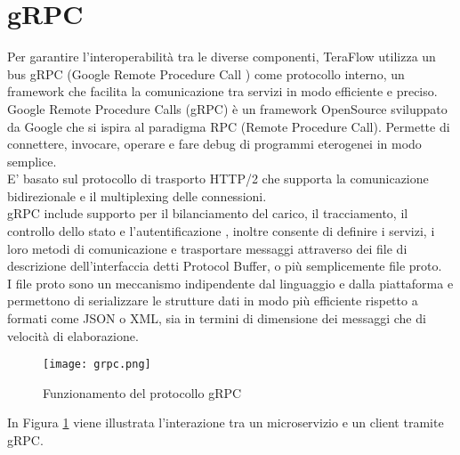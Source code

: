 \section{gRPC} \label{grpc}
Per garantire l'interoperabilità tra le diverse componenti, TeraFlow utilizza un bus gRPC (Google Remote Procedure Call \cite{grpc}) come protocollo interno, 
un framework che facilita la comunicazione tra servizi in modo efficiente e preciso. 
\\Google Remote Procedure Calls (gRPC\cite{grpc}) è un framework OpenSource sviluppato da Google che si ispira al paradigma RPC (Remote Procedure Call). Permette di
connettere, invocare, operare e fare debug di programmi eterogenei in modo semplice.
\\E' basato sul protocollo di trasporto HTTP/2 che supporta la comunicazione bidirezionale e il multiplexing delle connessioni.
\\gRPC include supporto per il bilanciamento del carico, il tracciamento, il controllo dello stato e l'autentificazione\cite{grpcArt3} \cite{grpcArt1}, inoltre
consente di definire i servizi, i loro metodi di comunicazione e trasportare messaggi attraverso dei file di descrizione dell'interfaccia detti Protocol Buffer, o più semplicemente file proto.
\\I file proto sono un meccanismo indipendente dal linguaggio e dalla piattaforma 
e permettono di serializzare le strutture dati in modo più efficiente rispetto a formati come JSON o XML, sia in termini di dimensione dei messaggi che di velocità di elaborazione.
\begin{figure}[h]
    \centering
   \texttt{[image: grpc.png]}
    \caption{Funzionamento del protocollo gRPC \cite{librogrpc}}
    \label{fig:grpc}
\end{figure}
In Figura \ref{fig:grpc} viene illustrata l'interazione tra un microservizio e un client tramite gRPC.
